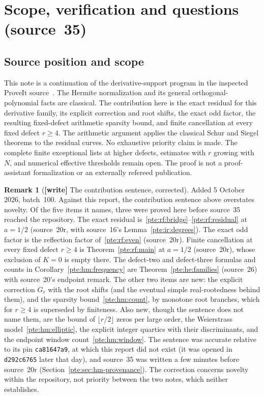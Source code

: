 \documentclass[11pt,a4paper]{article}
\numberwithin{equation}{section}
\theoremstyle{definition}
\newtheorem{remark}[theorem]{Remark}
\theoremstyle{plain}
\newcommand{\src}[1]{\texorpdfstring{\textup{(source~#1)}}{(source #1)}}
\begin{document}
\section{Scope, verification and questions \src{35}}\label{pte:sec:hm-scope}
\subsection{Source position and scope}\label{pte:sec:hm-position}
This note is a continuation of the derivative-support program in the inspected ProveIt source~\cite{pte-host}. The Hermite normalization and its general orthogonal-polynomial facts are classical. The contribution here is the exact residual for this derivative family, its explicit correction and root shifts, the exact odd factor, the resulting fixed-defect arithmetic sparsity bound, and finite cancellation at every fixed defect $r\ge4$. The arithmetic argument applies the classical Schur and Siegel theorems to the residual curves. No exhaustive priority claim is made. The complete finite exceptional lists at higher defects, estimates with $r$ growing with $N$, and numerical effective thresholds remain open. The proof is not a proof-assistant formalization or an externally refereed publication.

\begin{remark}[\textbf{[write]} The contribution sentence, corrected]\label{pte:hm:rem:contribution}
Added 5 October 2026, batch~100. Against this report, the contribution sentence above overstates novelty. Of the five items it names, three were proved here before source~35 reached the repository. The exact residual is~\eqref{pte:rf:bridge}--\eqref{pte:rf:residual} at $a=1/2$ (source~20r, with source~16's Lemma~\ref{pte:ir:degrees}). The exact odd factor is the reflection factor of~\eqref{pte:rf:even} (source~20r). Finite cancellation at every fixed defect $r\ge4$ is Theorem~\ref{pte:rf:main} at $a=1/2$ (source~20r), whose exclusion of $K=0$ is empty there. The defect-two and defect-three formulas and counts in Corollary~\ref{pte:hm:frequency} are Theorem~\ref{pte:he:families} (source~26) with source~20's endpoint remark. The other two items are new: the explicit correction $G_r$ with the root shifts (and the eventual simple real-rootedness behind them), and the sparsity bound~\eqref{pte:hm:count}, by monotone root branches, which for $r\ge4$ is superseded by finiteness. Also new, though the sentence does not name them, are the bound of $\lfloor r/2\rfloor$ zeros per large order, the Weierstrass model~\eqref{pte:hm:elliptic}, the explicit integer quartics with their discriminants, and the endpoint window count~\eqref{pte:hm:window}. The sentence was accurate relative to its pin \texttt{ca81647a9}, at which this report did not exist (it was opened in \texttt{d292c6765} later that day), and source~35 was written a few minutes before source~20r (Section~\ref{pte:sec:hm-provenance}). The correction concerns novelty within the repository, not priority between the two notes, which neither establishes.
\end{remark}
\end{document}
